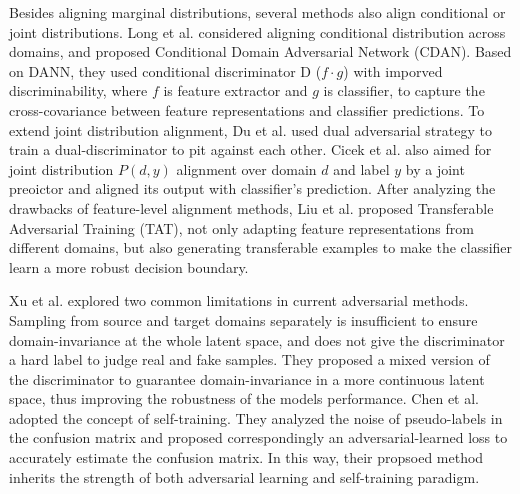\documentclass[conference]{IEEEtran}
\begin{document}
Besides aligning marginal distributions, several methods also align 
conditional or joint distributions. Long et al. considered aligning 
conditional distribution across domains, and proposed Conditional Domain
Adversarial Network (CDAN). 
Based on DANN, they used conditional discriminator D ($f \cdot g$) with 
imporved discriminability, where $f$ is feature extractor and $g$ is 
classifier, to capture the cross-covariance between feature representations 
and classifier predictions. 
To extend joint distribution alignment, Du et al. used dual adversarial 
strategy to train a dual-discriminator to pit against each other.
Cicek et al. also aimed for joint distribution $P(d, y)$ alignment over 
domain $d$ and label $y$ by a joint preoictor and aligned its output with 
classifier's prediction.
After analyzing the drawbacks of feature-level alignment methods, Liu et al.
proposed Transferable Adversarial Training (TAT), not only adapting feature
representations from different domains, but also generating transferable 
examples to make the classifier learn a more robust decision boundary.

Xu et al. explored two common limitations in current adversarial methods.
Sampling from source and target domains separately is insufficient
to ensure domain-invariance at the whole latent space, and does not give 
the discriminator a hard label to judge real and fake samples.
They proposed a mixed version of the discriminator to guarantee domain-invariance 
in a more continuous latent space, thus improving the robustness of the models performance.
Chen et al. adopted the concept of self-training. They analyzed the 
noise of pseudo-labels in the confusion matrix and proposed correspondingly an
adversarial-learned loss to accurately estimate the confusion matrix.
In this way, their propsoed method inherits the strength of both adversarial
learning and self-training paradigm.
\end{document}
